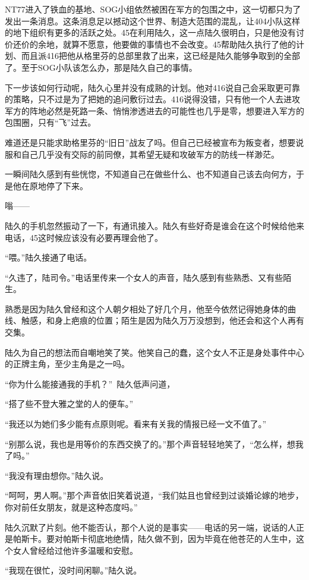 NT77进入了铁血的基地、SOG小组依然被困在军方的包围之中，这一切都只为了发出一条消息。这条消息足以撼动这个世界、制造大范围的混乱，让404小队这样的地下组织有更多的活跃之处。45在利用陆久，这一点陆久很明白，只是他没有讨价还价的余地，就算不愿意，他要做的事情也不会改变。45帮助陆久执行了他的计划、而且派416把他从格里芬的总部里救了出来，这已经是陆久能够争取到的全部了。至于SOG小队该怎么办，那是陆久自己的事情。

下一步该如何行动呢，陆久心里并没有成熟的计划。他对416说自己会采取更可靠的策略，只不过是为了把她的追问敷衍过去。416说得没错，只有他一个人去进攻军方的阵地必然是死路一条、悄悄渗透进去的可能性也几乎是零，想要进入军方的包围圈，只有“飞”过去。

难道还是只能求助格里芬的“旧日”战友了吗。但自己已经被宣布为叛变者，想要说服和自己几乎没有交际的前同僚，其希望无疑和攻破军方的防线一样渺茫。

一瞬间陆久感到有些恍惚，不知道自己在做些什么、也不知道自己该去向何方，于是他在原地停了下来。

嗡——

陆久的手机忽然振动了一下，有通讯接入。陆久有些好奇是谁会在这个时候给他来电话，45这时候应该没有必要再理会他了。

“喂。”陆久接通了电话。

“久违了，陆司令。”电话里传来一个女人的声音，陆久感到有些熟悉、又有些陌生。

熟悉是因为陆久曾经和这个人朝夕相处了好几个月，他至今依然记得她身体的曲线、触感，和身上疤痕的位置；陌生是因为陆久万万没想到，他还会和这个人再有交集。

陆久为自己的想法而自嘲地笑了笑。他笑自己的蠢，这个女人不正是身处事件中心的正牌主角，至少主角是之一吗。

“你为什么能接通我的手机？” 陆久低声问道，

“搭了些不登大雅之堂的人的便车。”

“我还以为她们多少能有点原则呢。看来有关我的情报已经一文不值了。”

“别那么说，我也是用等价的东西交换了的。”那个声音轻轻地笑了，“怎么样，想我了吗。”

“我没有理由想你。”陆久说。

“呵呵，男人啊。”那个声音依旧笑着说道，“我们姑且也曾经到过谈婚论嫁的地步，你对前任女朋友，就是这种态度吗。”

陆久沉默了片刻。他不能否认，那个人说的是事实——电话的另一端，说话的人正是帕斯卡。要对帕斯卡彻底地绝情，陆久做不到，因为毕竟在他苍茫的人生中，这个女人曾经给过他许多温暖和安慰。

“我现在很忙，没时间闲聊。”陆久说。

